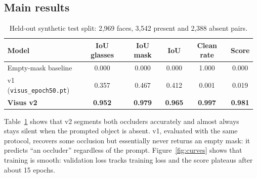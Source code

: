 \documentclass[11pt,a4paper]{article}
\begin{document}
\begin{table}[h]
  \centering
  \caption{Training configuration of Visus v2.}
  \label{tab:hparams}
  \small
\end{table}

\subsection{Main results}

\begin{table}[h]
  \centering
  \caption{Held-out synthetic test split: 2,969 faces, 3,542 present and 2,388 absent pairs.}
  \label{tab:main}
  \begin{tabular}{lccccc}
    \toprule
    Model & IoU glasses & IoU mask & IoU & Clean rate & Score \\
    \midrule
    Empty-mask baseline & 0.000 & 0.000 & 0.000 & 1.000 & 0.000 \\
    v1 (\texttt{visus\_epoch50.pt}) & 0.357 & 0.467 & 0.412 & 0.001 & 0.019 \\
    \textbf{Visus v2} & \textbf{0.952} & \textbf{0.979} & \textbf{0.965} & \textbf{0.997} & \textbf{0.981} \\
    \bottomrule
  \end{tabular}
\end{table}

Table~\ref{tab:main} shows that v2 segments both occluders accurately and almost always stays silent when
the prompted object is absent. v1, evaluated with the same protocol, recovers some occlusion but
essentially never returns an empty mask: it predicts ``an occluder'' regardless of the prompt.
Figure~\ref{fig:curves} shows that training is smooth: validation loss tracks training loss and the
score plateaus after about 15 epochs.
\end{document}
